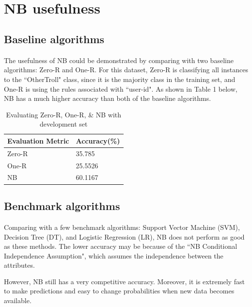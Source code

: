 \documentclass[11pt]{article}
\begin{document}
\section{NB usefulness}

\subsection{Baseline algorithms}
\paragraph{} The usefulness of NB could be demonstrated by comparing with two baseline algorithms: Zero-R and One-R. For this dataset, Zero-R is classifying all instances to the ``OtherTroll" class, since it is the majority class in the training set, and One-R is using the rules associated with ``user-id". As shown in Table 1 below, NB has a much higher accuracy than both of the baseline algorithms.

\begin{table}[!htbp]
 \begin{center}
\begin{tabular}{| l | l |}
      \hline
      Evaluation Metric & Accuracy(\%) \\
      \hline\hline
      Zero-R & 35.785 \\
      One-R & 25.5526 \\
      NB &  60.1167\\
      \hline
\end{tabular}
\caption{Evaluating Zero-R, One-R, \& NB with development set}\label{table1}
 \end{center}
\end{table}

\subsection{Benchmark algorithms}

\paragraph{}Comparing with a few benchmark algorithms: Support Vector Machine (SVM), Decision Tree (DT), and Logistic Regression (LR), NB does not perform as good as these methods. The lower accuracy may be because of the ``NB Conditional Independence Assumption", which assumes the independence between the attributes. 

However, NB still has a very competitive accuracy. Moreover, it is extremely fast to make predictions and easy to change probabilities when new data becomes available.
\end{document}
